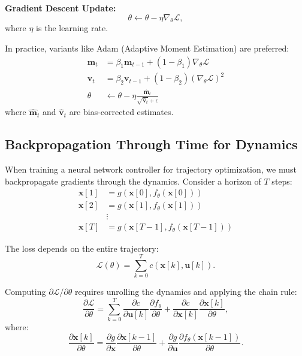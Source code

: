 \textbf{Gradient Descent Update:}
\begin{equation}
\theta \leftarrow \theta - \eta \nabla_\theta \mathcal{L},
\end{equation}
where $\eta$ is the learning rate.

In practice, variants like Adam (Adaptive Moment Estimation) are preferred:
\begin{align}
\mathbf{m}_t &= \beta_1 \mathbf{m}_{t-1} + (1-\beta_1)\nabla_\theta \mathcal{L} \\
\mathbf{v}_t &= \beta_2 \mathbf{v}_{t-1} + (1-\beta_2)(\nabla_\theta \mathcal{L})^2 \\
\theta &\leftarrow \theta - \eta \frac{\hat{\mathbf{m}}_t}{\sqrt{\hat{\mathbf{v}}_t} + \epsilon}
\end{align}
where $\hat{\mathbf{m}}_t$ and $\hat{\mathbf{v}}_t$ are bias-corrected estimates.

\subsection{Backpropagation Through Time for Dynamics}

When training a neural network controller for trajectory optimization, we must backpropagate gradients through the dynamics. Consider a horizon of $T$ steps:
\begin{align}
\mathbf{x}[1] &= g(\mathbf{x}[0], f_\theta(\mathbf{x}[0])) \\
\mathbf{x}[2] &= g(\mathbf{x}[1], f_\theta(\mathbf{x}[1])) \\
&\vdots \\
\mathbf{x}[T] &= g(\mathbf{x}[T-1], f_\theta(\mathbf{x}[T-1]))
\end{align}

The loss depends on the entire trajectory:
\begin{equation}
\mathcal{L}(\theta) = \sum_{k=0}^{T} c(\mathbf{x}[k], \mathbf{u}[k]).
\end{equation}

Computing $\partial \mathcal{L}/\partial \theta$ requires unrolling the dynamics and applying the chain rule:
\begin{equation}
\frac{\partial \mathcal{L}}{\partial \theta} = \sum_{k=0}^{T} \frac{\partial c}{\partial \mathbf{u}[k]} \frac{\partial f_\theta}{\partial \theta} + \frac{\partial c}{\partial \mathbf{x}[k]} \frac{\partial \mathbf{x}[k]}{\partial \theta},
\end{equation}
where:
\begin{equation}
\frac{\partial \mathbf{x}[k]}{\partial \theta} = \frac{\partial g}{\partial \mathbf{x}}\frac{\partial \mathbf{x}[k-1]}{\partial \theta} + \frac{\partial g}{\partial \mathbf{u}}\frac{\partial f_\theta(\mathbf{x}[k-1])}{\partial \theta}.
\end{equation}


